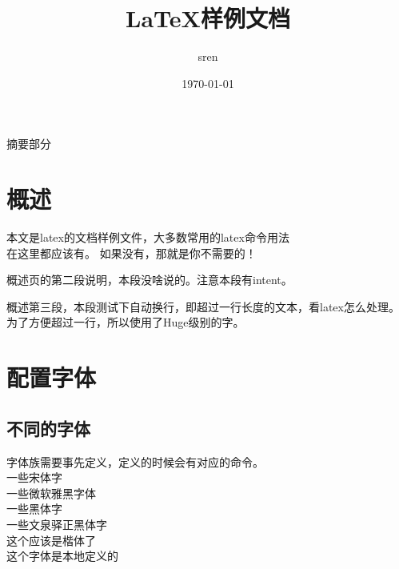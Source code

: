 \documentclass[a4paper,12pt]{article} %
\title{LaTeX样例文档}
\author{sren}
\date{\today}
\begin{document}
\maketitle
\thispagestyle{empty} %


\newpage
{}
摘要部分


\newpage
\tableofcontents                
\newpage
\listoffigures
\newpage
\listoftables


\newpage %
\pagestyle{fancy}
\newsavebox{\headpic}
\lhead{}
\rhead{}
\cfoot{}
\renewcommand{\headrulewidth}{0.4pt}
\renewcommand{\footrulewidth}{0.4pt}

 \section{概述}
 本文是latex的文档样例文件，大多数常用的latex命令用法\\在这里都应该有。
 如果没有，那就是你不需要的！

  概述页的第二段说明，本段没啥说的。注意本段有intent。

  {\Huge 概述第三段，本段测试下自动换行，即超过一行长度的文本，看latex怎么处理。为了方便超过一行，所以使用了Huge级别的字。}
  \pagebreak

 
 \section[pz字体]{配置字体} %
 \subsection{不同的字体}
 字体族需要事先定义，定义的时候会有对应的命令。\\
 {\song 一些宋体字}\\ %
 {\yahei 一些微软雅黑字体}\\
 {\hei 一些黑体字}\\
 {\zhei 一些文泉驿正黑体字}\\
 {\kai 这个应该是楷体了}\\
 { 这个字体是本地定义的}
\end{document}

